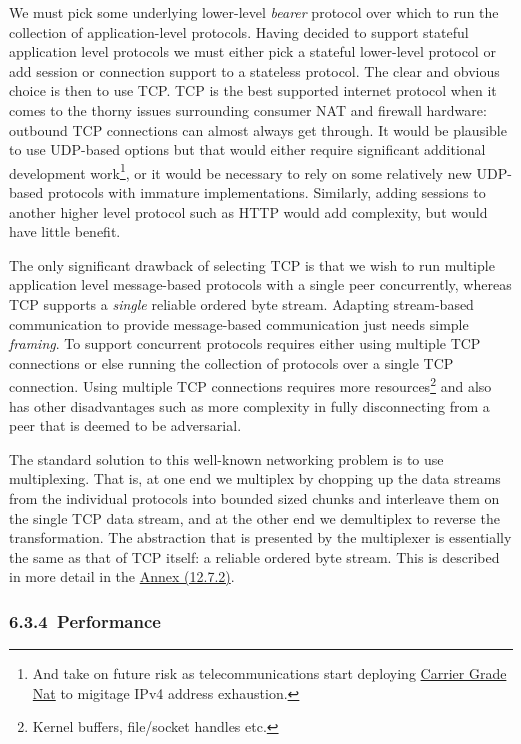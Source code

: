 \documentclass[]{article}
\begin{document}
We must pick some underlying lower-level \emph{bearer} protocol over
which to run the collection of application-level protocols. Having
decided to support stateful application level protocols we must either
pick a stateful lower-level protocol or add session or connection
support to a stateless protocol. The clear and obvious choice is then to
use TCP. TCP is the best supported internet protocol when it comes to
the thorny issues surrounding consumer NAT and firewall hardware:
outbound TCP connections can almost always get through. It would be
plausible to use UDP-based options but that would either require
significant additional development work\footnote{And take on future risk
  as telecommunications start deploying
  \href{https://en.wikipedia.org/wiki/Carrier-grade_NAT}{{Carrier Grade
  Nat}} to migitage IPv4 address exhaustion.}, or it would be necessary
to rely on some relatively new UDP-based protocols with immature
implementations. Similarly, adding sessions to another higher level
protocol such as HTTP would add complexity, but would have little
benefit.

The only significant drawback of selecting TCP is that we wish to run
multiple application level message-based protocols with a single peer
concurrently, whereas TCP supports a \emph{single} reliable ordered byte
stream. Adapting stream-based communication to provide message-based
communication just needs simple \emph{framing}. To support concurrent
protocols requires either using multiple TCP connections or else running
the collection of protocols over a single TCP connection. Using multiple
TCP connections requires more resources\footnote{Kernel buffers,
  file/socket handles etc.} and also has other disadvantages such as
more complexity in fully disconnecting from a peer that is deemed to be
adversarial.

The standard solution to this well-known networking problem is to use
multiplexing. That is, at one end we multiplex by chopping up the data
streams from the individual protocols into bounded sized chunks and
interleave them on the single TCP data stream, and at the other end we
demultiplex to reverse the transformation. The abstraction that is
presented by the multiplexer is essentially the same as that of TCP
itself: a reliable ordered byte stream. This is described in more detail
in the \protect\hyperlink{network-mux}{{Annex (12.7.2)}}.

\hypertarget{performance}{%
\subsubsection{​6.3.4​~Performance}\label{performance}}
\end{document}
